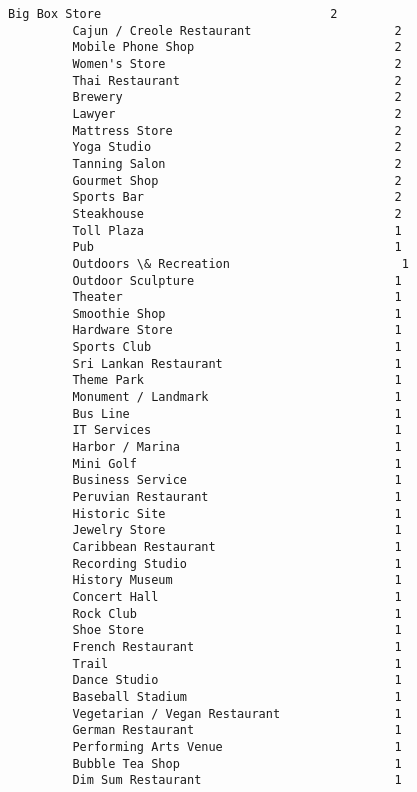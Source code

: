 \documentclass[11pt]{article}
\begin{document}
\begin{Verbatim}[commandchars=\\\{\}]
         Big Box Store                                2
         Cajun / Creole Restaurant                    2
         Mobile Phone Shop                            2
         Women's Store                                2
         Thai Restaurant                              2
         Brewery                                      2
         Lawyer                                       2
         Mattress Store                               2
         Yoga Studio                                  2
         Tanning Salon                                2
         Gourmet Shop                                 2
         Sports Bar                                   2
         Steakhouse                                   2
         Toll Plaza                                   1
         Pub                                          1
         Outdoors \& Recreation                        1
         Outdoor Sculpture                            1
         Theater                                      1
         Smoothie Shop                                1
         Hardware Store                               1
         Sports Club                                  1
         Sri Lankan Restaurant                        1
         Theme Park                                   1
         Monument / Landmark                          1
         Bus Line                                     1
         IT Services                                  1
         Harbor / Marina                              1
         Mini Golf                                    1
         Business Service                             1
         Peruvian Restaurant                          1
         Historic Site                                1
         Jewelry Store                                1
         Caribbean Restaurant                         1
         Recording Studio                             1
         History Museum                               1
         Concert Hall                                 1
         Rock Club                                    1
         Shoe Store                                   1
         French Restaurant                            1
         Trail                                        1
         Dance Studio                                 1
         Baseball Stadium                             1
         Vegetarian / Vegan Restaurant                1
         German Restaurant                            1
         Performing Arts Venue                        1
         Bubble Tea Shop                              1
         Dim Sum Restaurant                           1

\end{Verbatim}
\end{document}

